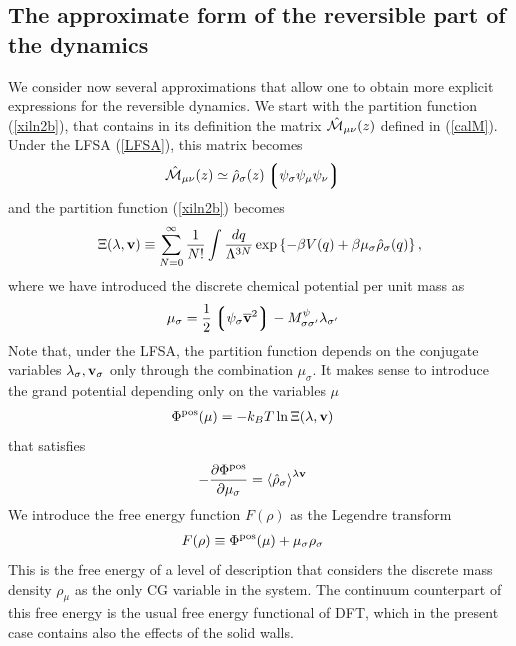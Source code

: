 \documentclass[b5paper,openright,10pt]{book}
\newcommand{\llangle}{\left\langle}
\newcommand{\rrangle}{\right\rangle}
\newcommand{\llg}{\left\lgroup}
\newcommand{\rlg}{\right\rgroup}
\begin{document}
\begin{appendices}
\section{The approximate form of the reversible part of the dynamics}
\label{Ap:aproxRevDyn}
We consider now  several approximations that allow one  to obtain more
explicit expressions  for the reversible  dynamics. We start  with the
partition function (\ref{xiln2b}), that contains in its definition the
matrix $\hat{\cal M}_{\mu\nu}(z)$ defined  in (\ref{calM}).  Under the
LFSA (\ref{LFSA}), this matrix becomes
\begin{align}
  \hat{\cal M}_{\mu\nu}(z)
&\simeq\hat{\rho}_\sigma(z)\llg\psi_\sigma\psi_\mu\psi_\nu\rlg
\label{Mapprox}
\end{align}
and the partition function (\ref{xiln2b}) becomes
\begin{align}
\Xi(\lambda,{\bf v})\equiv \sum_{N=0}^\infty \frac{1}{N!}
\int \frac{dq}{\Lambda^{3N}}
\exp\left\{-\beta V(q)+\beta\mu_\sigma\hat{\rho}_{\sigma}(q)
\right\},
\label{xiln3}
\end{align}
where we have introduced the discrete chemical potential per unit mass as
\begin{align}
\mu_\sigma&=\frac{1}{2}\llg\psi_\sigma\overline{\bf v}^2\rlg-  M^\psi_{\sigma\sigma'}\lambda_{\sigma'}
\label{ChemPot}
\end{align}
Note  that, under  the LFSA,  the  partition function  depends on  the
conjugate variables  $\lambda_\sigma,{\bf v}_\sigma$ only  through the
combination  $\mu_\sigma$.   It makes  sense  to  introduce the  grand
potential depending only on the variables $\mu$
\begin{align}
  \Phi^{\rm pos}(\mu)&=-k_BT\ln \Xi(\lambda,{\bf v})
\end{align}
that satisfies
\begin{align}
-\frac{\partial \Phi^{\rm pos}}{\partial\mu_\sigma}&=
\llangle \hat{\rho}_\sigma\rrangle^{\lambda{\bf v}}
\end{align}
We introduce the free  energy function $F(\rho)$ as the Legendre
transform
\begin{align}
  F(\rho)&\equiv  \Phi^{\rm pos}(\mu)+ \mu_\sigma \rho_\sigma
\label{legAp}
\end{align}
This is the  free energy of a level of  description that considers the
discrete  mass density  $\rho_\mu$  as  the only  CG  variable in  the
system. The  continuum counterpart  of this free  energy is  the usual
free energy functional of DFT, which in the present case contains also
the effects of the solid walls. 


\end{appendices}
\end{document}
